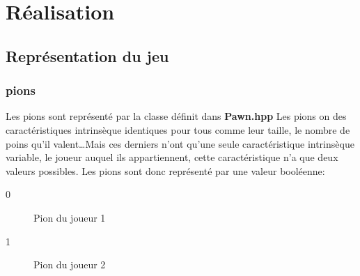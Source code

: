 \documentclass[article, backcover, french, nodocumentinfo]{upmethodology-document}
\begin{document}
	\section{Réalisation}
		\subsection{Représentation du jeu}
			\subsubsection{pions}
					Les pions sont représenté par la classe  définit dans \textbf{Pawn.hpp}
					Les pions on des caractéristiques intrinsèque identiques pour tous comme leur taille, le nombre de poins qu'il valent\ldots Mais ces derniers n'ont qu'une seule caractéristique intrinsèque variable, le joueur auquel ils appartiennent, cette caractéristique n'a que deux valeurs possibles.
					Les pions sont donc représenté par une valeur booléenne:
					\begin{description}
						\item[0] Pion du joueur 1
						\item[1] Pion du joueur 2
					\end{description}
\end{document}
